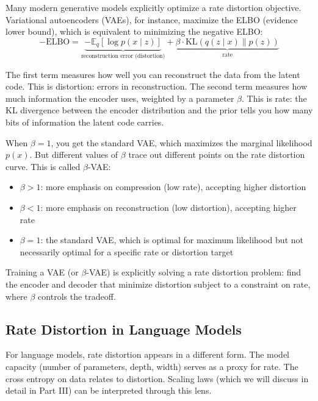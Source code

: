 Many modern generative models explicitly optimize a rate distortion objective. Variational autoencoders (VAEs), for instance, maximize the ELBO (evidence lower bound), which is equivalent to minimizing the negative ELBO:
\begin{equation}
-\text{ELBO} = \underbrace{-\mathbb{E}_{q}[\log p(x \mid z)]}_{\text{reconstruction error (distortion)}} + \underbrace{\beta \cdot \text{KL}(q(z \mid x) \| p(z))}_{\text{rate}}
\end{equation}

The first term measures how well you can reconstruct the data from the latent code. This is distortion: errors in reconstruction. The second term measures how much information the encoder uses, weighted by a parameter $\beta$. This is rate: the KL divergence between the encoder distribution and the prior tells you how many bits of information the latent code carries.

When $\beta = 1$, you get the standard VAE, which maximizes the marginal likelihood $p(x)$. But different values of $\beta$ trace out different points on the rate distortion curve. This is called $\beta$-VAE:

\begin{itemize}
\item $\beta > 1$: more emphasis on compression (low rate), accepting higher distortion
\item $\beta < 1$: more emphasis on reconstruction (low distortion), accepting higher rate
\item $\beta = 1$: the standard VAE, which is optimal for maximum likelihood but not necessarily optimal for a specific rate or distortion target
\end{itemize}

Training a VAE (or $\beta$-VAE) is explicitly solving a rate distortion problem: find the encoder and decoder that minimize distortion subject to a constraint on rate, where $\beta$ controls the tradeoff.

\subsection{Rate Distortion in Language Models}

For language models, rate distortion appears in a different form. The model capacity (number of parameters, depth, width) serves as a proxy for rate. The cross entropy on data relates to distortion. Scaling laws (which we will discuss in detail in Part III) can be interpreted through this lens.

